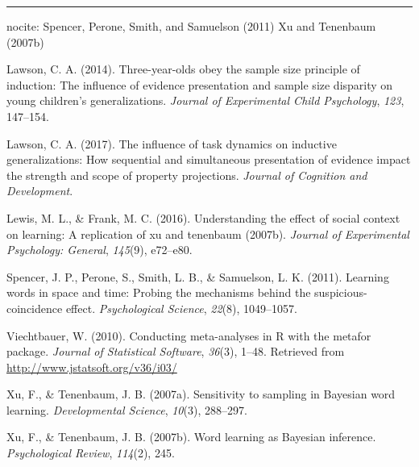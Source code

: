 \documentclass[english,floatsintext,man]{apa6}
\theoremstyle{definition}
\theoremstyle{definition}
\theoremstyle{remark}
\begin{document}
\begin{center}\rule{0.5\linewidth}{\linethickness}\end{center}

nocite: \textbar{} Spencer, Perone, Smith, and Samuelson (2011) Xu and
Tenenbaum (2007b)

\setlength{\parindent}{-0.5in} \setlength{\leftskip}{0.5in}

\hypertarget{refs}{}
\hypertarget{ref-lawson2014three}{}
Lawson, C. A. (2014). Three-year-olds obey the sample size principle of
induction: The influence of evidence presentation and sample size
disparity on young children's generalizations. \emph{Journal of
Experimental Child Psychology}, \emph{123}, 147--154.

\hypertarget{ref-lawson2017influence}{}
Lawson, C. A. (2017). The influence of task dynamics on inductive
generalizations: How sequential and simultaneous presentation of
evidence impact the strength and scope of property projections.
\emph{Journal of Cognition and Development}.

\hypertarget{ref-lewis2016understanding}{}
Lewis, M. L., \& Frank, M. C. (2016). Understanding the effect of social
context on learning: A replication of xu and tenenbaum (2007b).
\emph{Journal of Experimental Psychology: General}, \emph{145}(9),
e72--e80.

\hypertarget{ref-spencer2011learning}{}
Spencer, J. P., Perone, S., Smith, L. B., \& Samuelson, L. K. (2011).
Learning words in space and time: Probing the mechanisms behind the
suspicious-coincidence effect. \emph{Psychological Science},
\emph{22}(8), 1049--1057.

\hypertarget{ref-R-metafor}{}
Viechtbauer, W. (2010). Conducting meta-analyses in R with the metafor
package. \emph{Journal of Statistical Software}, \emph{36}(3), 1--48.
Retrieved from \url{http://www.jstatsoft.org/v36/i03/}

\hypertarget{ref-xu2007}{}
Xu, F., \& Tenenbaum, J. B. (2007a). Sensitivity to sampling in Bayesian
word learning. \emph{Developmental Science}, \emph{10}(3), 288--297.

\hypertarget{ref-xu2007word}{}
Xu, F., \& Tenenbaum, J. B. (2007b). Word learning as Bayesian
inference. \emph{Psychological Review}, \emph{114}(2), 245.
\end{document}

